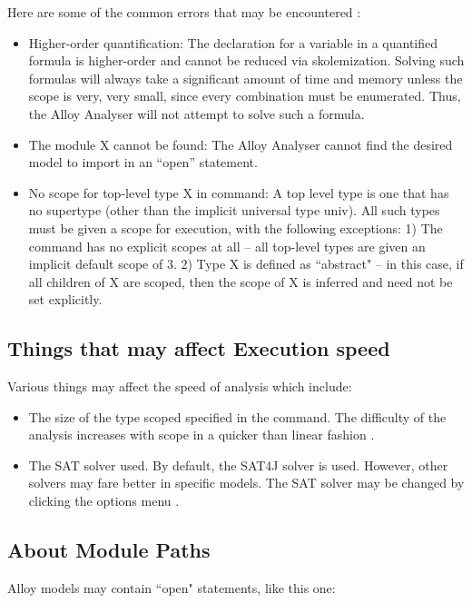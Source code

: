 \documentclass[a4paper,12pt]{report}
\begin{document}
Here are some of the common errors that may be encountered \cite{DanielJackson2004}:
\begin{itemize}
\item Higher-order quantification: The declaration for a variable in a quantified formula is higher-order and cannot be reduced via skolemization. Solving such formulas will always take a significant amount of time and memory unless the scope is very, very small, since every combination must be enumerated. Thus, the Alloy Analyser will not attempt to solve such a formula.
\item The module X cannot be found: The Alloy Analyser cannot find the desired model to import in an ``open” statement.
\item No scope for top-level type X in command: A top level type is one that has no supertype (other than the implicit universal type univ). All such types must be given a scope for execution, with the following exceptions: 1) The command has no explicit scopes at all – all top-level types are given an implicit default scope of 3.
2) Type X is defined as ``abstract" – in this case, if all children of X are scoped, then the scope of X is inferred and need not be set explicitly.
\end{itemize}

\subsection{Things that may affect Execution speed}
\label{Things affecting execution speed}

Various things may affect the speed of analysis which include:
\begin{itemize}
\item The size of the type scoped specified in the command. The difficulty of the analysis increases with scope in a quicker than linear fashion \cite{DanielJackson2004}.
\item The SAT solver used. By default, the SAT4J solver is used. However, other solvers may fare better in specific models. The SAT solver may be changed by clicking the options menu \cite{DanielJackson2004}.
\end{itemize}

\subsection{About Module Paths}
\label{Module Paths}

Alloy models may contain ``open" statements, like this one:
\end{document}
